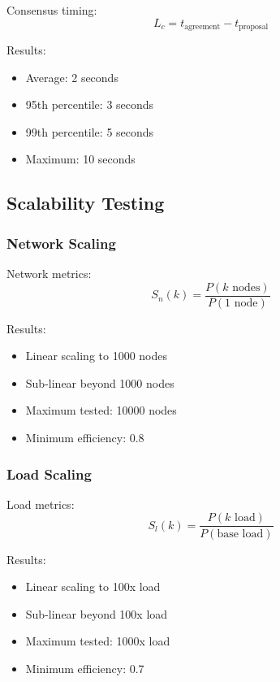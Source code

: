 \documentclass[12pt]{article}
\begin{document}
Consensus timing:
\begin{equation}
L_c = t_{\text{agreement}} - t_{\text{proposal}}
\end{equation}

Results:
\begin{itemize}
\item Average: 2 seconds
\item 95th percentile: 3 seconds
\item 99th percentile: 5 seconds
\item Maximum: 10 seconds
\end{itemize}

\subsection{Scalability Testing}

\subsubsection{Network Scaling}

Network metrics:
\begin{equation}
S_n(k) = \frac{P(k\text{ nodes})}{P(1\text{ node})}
\end{equation}

Results:
\begin{itemize}
\item Linear scaling to 1000 nodes
\item Sub-linear beyond 1000 nodes
\item Maximum tested: 10000 nodes
\item Minimum efficiency: 0.8
\end{itemize}

\subsubsection{Load Scaling}

Load metrics:
\begin{equation}
S_l(k) = \frac{P(k\text{ load})}{P(\text{base load})}
\end{equation}

Results:
\begin{itemize}
\item Linear scaling to 100x load
\item Sub-linear beyond 100x load
\item Maximum tested: 1000x load
\item Minimum efficiency: 0.7
\end{itemize}
\end{document}
